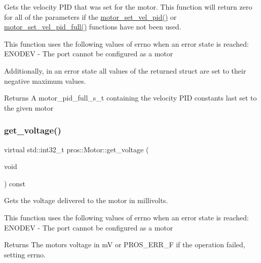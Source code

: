 Gets the velocity P\+ID that was set for the motor. This function will return zero for all of the parameters if the \hyperlink{motors_8h_a4255880d012ed0ec856f302536755d8a}{motor\+\_\+set\+\_\+vel\+\_\+pid()} or \hyperlink{motors_8h_acdec538d8f08e8b5946294f84f017e8e}{motor\+\_\+set\+\_\+vel\+\_\+pid\+\_\+full()} functions have not been used.

This function uses the following values of errno when an error state is reached\+: E\+N\+O\+D\+EV -\/ The port cannot be configured as a motor

Additionally, in an error state all values of the returned struct are set to their negative maximum values.

\begin{DoxyReturn}{Returns}
A motor\+\_\+pid\+\_\+full\+\_\+s\+\_\+t containing the velocity P\+ID constants last set to the given motor 
\end{DoxyReturn}
\mbox{\label{classpros_1_1Motor_abe51732c37c2ec72a8bdceac7f6962cb}} 
\subsubsection{\texorpdfstring{get\+\_\+voltage()}{get\_voltage()}}
{\footnotesize\ttfamily virtual std\+::int32\+\_\+t pros\+::\+Motor\+::get\+\_\+voltage (\begin{DoxyParamCaption}\item[{void}]{ }\end{DoxyParamCaption}) const\hspace{0.3cm}{\ttfamily [virtual]}}

Gets the voltage delivered to the motor in millivolts.

This function uses the following values of errno when an error state is reached\+: E\+N\+O\+D\+EV -\/ The port cannot be configured as a motor

\begin{DoxyReturn}{Returns}
The motor\textquotesingle{}s voltage in mV or P\+R\+O\+S\+\_\+\+E\+R\+R\+\_\+F if the operation failed, setting errno. 
\end{DoxyReturn}
\mbox{\label{classpros_1_1Motor_a2afbe15bed764ca6d21f1e7c6c8da700}} 
